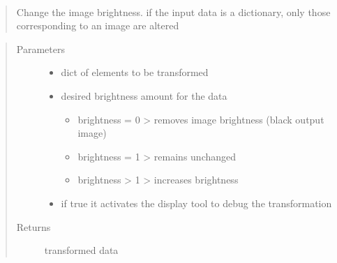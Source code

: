 \documentclass[letterpaper,10pt,english]{sphinxmanual}
\begin{document}
\begin{fulllineitems}
\label{\detokenize{ida_lib.operations:ida_lib.operations.transforms.change_brightness}}~\begin{quote}

Change the image brightness. if the input data is a dictionary, only those corresponding to an image are altered
\end{quote}
\begin{quote}\begin{description}
\item[{Parameters}] \leavevmode\begin{itemize}
\item {} 
 \textendash{} dict of elements to be transformed

\item {} 
 \textendash{} 
desired brightness amount for the data
\begin{itemize}
\item {} 
brightness = 0 \sphinxhyphen{}\textgreater{} removes image brightness (black output image)

\item {} 
brightness = 1 \sphinxhyphen{}\textgreater{} remains unchanged

\item {} 
brightness \textgreater{} 1 \sphinxhyphen{}\textgreater{} increases brightness

\end{itemize}


\item {} 
 \textendash{} if true it activates the display tool to debug the transformation

\end{itemize}

\item[{Returns}] \leavevmode
transformed data

\end{description}\end{quote}

\end{fulllineitems}
\end{document}
